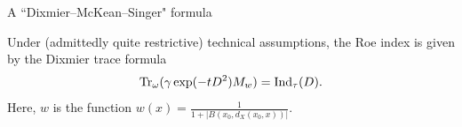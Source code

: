 \documentclass{beamer}
\numberwithin{equation}{section}
\theoremstyle{plain}
\theoremstyle{plain}
\theoremstyle{definition}
\theoremstyle{plain}
\theoremstyle{plain}
\theoremstyle{definition}
\newcommand{\tr}{{\rm Tr}}
\begin{document}
\begin{frame}{A ``Dixmier--McKean--Singer" formula}
    \begin{theorem}[Hekkelman-M. (2023)]
        Under (admittedly quite restrictive) technical assumptions, the Roe index is given by the Dixmier trace formula
        \begin{equation*}
            \tr_{\omega}(\gamma\exp(-tD^2)M_w) = \mathrm{Ind}_{\tau}(D).
        \end{equation*}
        Here, $w$ is the function $w(x) = \frac{1}{1+|B(x_0, d_X(x_0, x))|}.$
    \end{theorem}
\end{frame}

\begin{frame}
\end{frame}
\end{document}
